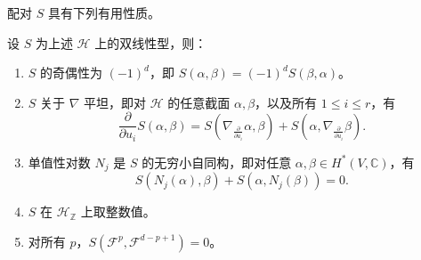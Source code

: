 配对 $S$ 具有下列有用性质。
\begin{lemma}\label{lem:a-model-pairing-properties}
设 $S$ 为上述 $\mathcal H$ 上的双线性型，则：
\begin{enumerate}[label=(\roman*)]
\item $S$ 的奇偶性为 $(-1)^d$，即 $S(\alpha,\beta)=(-1)^dS(\beta,\alpha)$。
\item $S$ 关于 $\nabla$ 平坦，即对 $\mathcal H$ 的任意截面 $\alpha,\beta$，以及所有 $1\le i\le r$，有
\[
\frac{\partial}{\partial u_i}S(\alpha,\beta)
=S\left(\nabla_{\frac{\partial}{\partial u_i}}\alpha,\beta\right)
+S\left(\alpha,\nabla_{\frac{\partial}{\partial u_i}}\beta\right).
\]
\item 单值性对数 $N_j$ 是 $S$ 的无穷小自同构，即对任意 $\alpha,\beta\in H^*(V,\mathbb C)$，有
\[
S(N_j(\alpha),\beta)+S(\alpha,N_j(\beta))=0.
\]
\item $S$ 在 $\mathcal H_{\mathbb Z}$ 上取整数值。
\item 对所有 $p$，$S(\mathcal F^p,\mathcal F^{d-p+1})=0$。
\end{enumerate}
\end{lemma}
